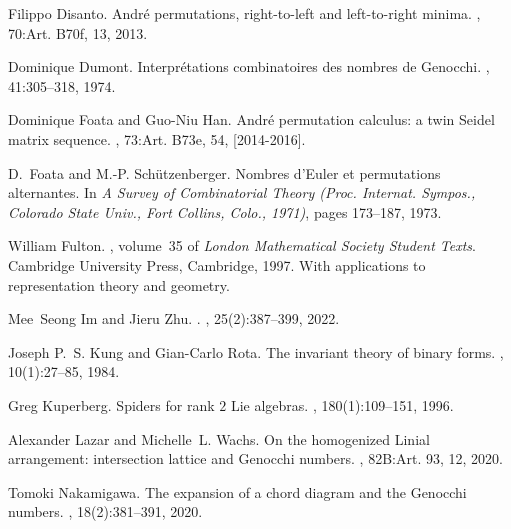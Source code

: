 \documentclass[reqno,12pt]{amsart}
\theoremstyle{definition}
\theoremstyle{remark}
\begin{document}

\begin{thebibliography}{Dum74}

  Filippo Disanto.
  \newblock Andr\'{e} permutations, right-to-left and left-to-right minima.
  , 70:Art. B70f, 13, 2013.
  
  Dominique Dumont.
  \newblock Interpr\'{e}tations combinatoires des nombres de {G}enocchi.
  , 41:305--318, 1974.
  
  Dominique Foata and Guo-Niu Han.
  \newblock Andr\'{e} permutation calculus: a twin {S}eidel matrix sequence.
  , 73:Art. B73e, 54, [2014-2016].
  
  D.~Foata and M.-P. Sch\"{u}tzenberger.
  \newblock Nombres d'{E}uler et permutations alternantes.
  \newblock In {\em A Survey of Combinatorial Theory ({P}roc. {I}nternat.
    {S}ympos., {C}olorado {S}tate {U}niv., {F}ort {C}ollins, {C}olo., 1971)},
    pages 173--187, 1973.
  
  William Fulton.
  , volume~35 of {\em London Mathematical Society
    Student Texts}.
  \newblock Cambridge University Press, Cambridge, 1997.
  \newblock With applications to representation theory and geometry.
  
  Mee~Seong Im and Jieru Zhu.
  .
  , 25(2):387--399, 2022.
  
  Joseph P.~S. Kung and Gian-Carlo Rota.
  \newblock The invariant theory of binary forms.
  , 10(1):27--85, 1984.
  
  Greg Kuperberg.
  \newblock Spiders for rank {$2$} {L}ie algebras.
  , 180(1):109--151, 1996.
  
  Alexander Lazar and Michelle~L. Wachs.
  \newblock On the homogenized {L}inial arrangement: intersection lattice and
    {G}enocchi numbers.
  , 82B:Art. 93, 12, 2020.
  
  Tomoki Nakamigawa.
  \newblock The expansion of a chord diagram and the {G}enocchi numbers.
  , 18(2):381--391, 2020.
  

\end{thebibliography}
\end{document}
